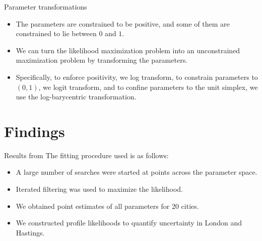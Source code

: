 \begin{frame}[fragile]{Parameter transformations}
  \begin{itemize}
  \item The parameters are constrained to be positive, and some of them are constrained to lie between $0$ and $1$.

  \item We can turn the likelihood maximization problem into an unconstrained maximization problem by transforming the parameters.

  \item Specifically, to enforce positivity, we log transform,
    to constrain parameters to $(0,1)$, we logit transform,
    and to confine parameters to the unit simplex, we use the log-barycentric transformation.
  \end{itemize}

\begin{knitrout}\small
{}\color{fgcolor}\begin{kframe}
\begin{alltt}
 \hlkwb{<-} \hlstd{(}
  \hlstd{=}\hlstd{(}\hlstd{,}\hlstd{,}\hlstd{,}\hlstd{,}\hlstd{),}
  \hlstd{=}\hlstd{(}\hlstd{,}\hlstd{),}
  \hlstd{=}\hlstd{(}\hlstd{,}\hlstd{,}\hlstd{,}\hlstd{)}
\hlstd{)}
\end{alltt}
\end{kframe}
\end{knitrout}
  

\end{frame}

\section{Findings}

\begin{frame}[fragile]{Results from \citet{He2010}}
  The fitting procedure used is as follows:
  \begin{itemize}
  \item A large number of searches were started at points across the parameter space.
  \item Iterated filtering was used to maximize the likelihood.
  \item We obtained point estimates of all parameters for 20 cities.
  \item We constructed profile likelihoods to quantify uncertainty in London and Hastings.
  \end{itemize}
\end{frame}

